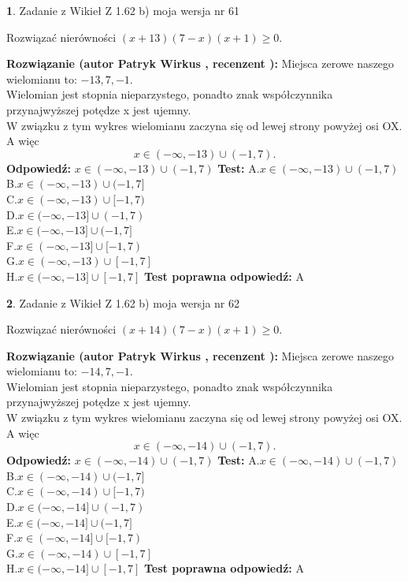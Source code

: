 \documentclass[12pt, a4paper]{article}
\theoremstyle{definition} %
\newtheorem{zad}{}
\newcommand{\zadStart}[1]{\begin{zad}#1\newline}
\newcommand{\zadStop}{\end{zad}}
\newcommand{\rozwStart}[2]{\noindent \textbf{Rozwiązanie (autor #1 , recenzent #2): }\newline}
\newcommand{\rozwStop}{\newline}
\newcommand{\odpStart}{\noindent \textbf{Odpowiedź:}\newline}
\newcommand{\odpStop}{\newline}
\newcommand{\testStart}{\noindent \textbf{Test:}\newline}
\newcommand{\testStop}{\newline}
\newcommand{\kluczStart}{\noindent \textbf{Test poprawna odpowiedź:}\newline}
\newcommand{\kluczStop}{\newline}
\begin{document}
\zadStart{Zadanie z Wikieł Z 1.62 b) moja wersja nr 61}

Rozwiązać nierówności $(x+13)(7-x)(x+1)\ge0$.
\zadStop
\rozwStart{Patryk Wirkus}{}
Miejsca zerowe naszego wielomianu to: $-13, 7, -1$.\\
Wielomian jest stopnia nieparzystego, ponadto znak współczynnika przy\linebreak najwyższej potędze x jest ujemny.\\ W związku z tym wykres wielomianu zaczyna się od lewej strony powyżej osi OX. A więc $$x \in (-\infty,-13) \cup (-1,7).$$
\rozwStop
\odpStart
$x \in (-\infty,-13) \cup (-1,7)$
\odpStop
\testStart
A.$x \in (-\infty,-13) \cup (-1,7)$\\
B.$x \in (-\infty,-13) \cup (-1,7]$\\
C.$x \in (-\infty,-13) \cup [-1,7)$\\
D.$x \in (-\infty,-13] \cup (-1,7)$\\
E.$x \in (-\infty,-13] \cup (-1,7]$\\
F.$x \in (-\infty,-13] \cup [-1,7)$\\
G.$x \in (-\infty,-13) \cup [-1,7]$\\
H.$x \in (-\infty,-13] \cup [-1,7]$
\testStop
\kluczStart
A
\kluczStop



\zadStart{Zadanie z Wikieł Z 1.62 b) moja wersja nr 62}

Rozwiązać nierówności $(x+14)(7-x)(x+1)\ge0$.
\zadStop
\rozwStart{Patryk Wirkus}{}
Miejsca zerowe naszego wielomianu to: $-14, 7, -1$.\\
Wielomian jest stopnia nieparzystego, ponadto znak współczynnika przy\linebreak najwyższej potędze x jest ujemny.\\ W związku z tym wykres wielomianu zaczyna się od lewej strony powyżej osi OX. A więc $$x \in (-\infty,-14) \cup (-1,7).$$
\rozwStop
\odpStart
$x \in (-\infty,-14) \cup (-1,7)$
\odpStop
\testStart
A.$x \in (-\infty,-14) \cup (-1,7)$\\
B.$x \in (-\infty,-14) \cup (-1,7]$\\
C.$x \in (-\infty,-14) \cup [-1,7)$\\
D.$x \in (-\infty,-14] \cup (-1,7)$\\
E.$x \in (-\infty,-14] \cup (-1,7]$\\
F.$x \in (-\infty,-14] \cup [-1,7)$\\
G.$x \in (-\infty,-14) \cup [-1,7]$\\
H.$x \in (-\infty,-14] \cup [-1,7]$
\testStop
\kluczStart
A
\kluczStop
\end{document}
